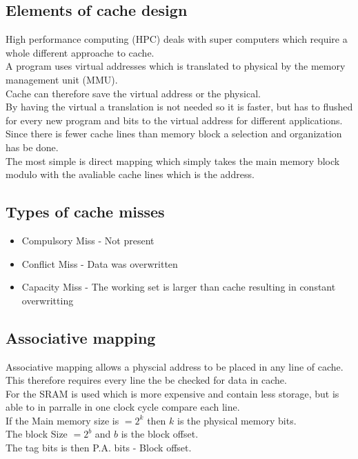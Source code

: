 \documentclass[12pt, a4paper]{article}
\begin{document}
		\subsection{Elements of cache design}
			High performance computing (HPC) deals with super computers which require a whole different approache to cache.\\
			A program uses virtual addresses which is translated to physical by the memory management unit (MMU).\\
			Cache can therefore save the virtual address or the physical.\\
			By having the virtual a translation is not needed so it is faster, but has to flushed for every new program and bits to the virtual address for different applications.\\
			Since there is fewer cache lines than memory block a selection and organization has be done.\\
			The most simple is direct mapping which simply takes the main memory block modulo with the avaliable cache lines which is the address.
		\subsection{Types of cache misses}
			\begin{itemize}
				\item Compulsory Miss - Not present
				\item Conflict Miss - Data was overwritten
				\item Capacity Miss - The working set is larger than cache resulting in constant overwritting
			\end{itemize}
		\subsection{Associative mapping}
			Associative mapping allows a physcial address to be placed in any line of cache.\\
			This therefore requires every line the be checked for data in cache.\\
			For the SRAM is used which is more expensive and contain less storage, but is able to in parralle in one clock cycle compare each line.\\
			If the Main memory size is $=2^k$ then $k$ is the physical memory bits.\\
			The block Size $=2^b$ and $b$ is the block offset.\\
			The tag bits is then P.A. bits - Block offset.
\end{document}

